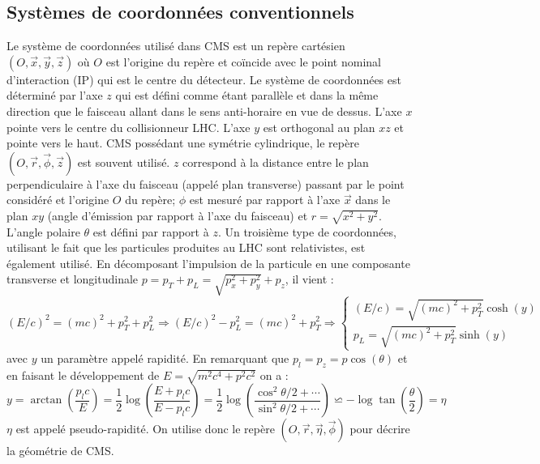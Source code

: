 \subsection{Systèmes de coordonnées conventionnels}
Le système de coordonnées utilisé dans CMS est un repère cartésien $\left(O,\vec{x},\vec{y},\vec{z}\right)$ où $O$ est l'origine du repère et coïncide avec le point nominal d'interaction (IP) qui est le centre du détecteur. Le système de coordonnées est déterminé par l'axe $z$ qui est défini comme étant parallèle et dans la même direction que le faisceau allant dans le sens anti-horaire en vue de dessus. L'axe $x$ pointe vers le centre du collisionneur LHC. L'axe $y$ est orthogonal au plan $xz$ et pointe vers le haut. CMS possédant une symétrie cylindrique, le repère $\left(O,\vec{r},\vec{\phi},\vec{z}\right)$ est souvent utilisé. $z$ correspond à la distance entre le plan perpendiculaire à l'axe du faisceau (appelé plan transverse) passant par le point considéré et l'origine $O$ du repère; $\phi$ est mesuré par rapport à l'axe $\vec{x}$ dans le plan $xy$ (angle d'émission par rapport à l'axe du faisceau) et $r=\sqrt{x^2+y^2}$. L'angle polaire $\theta$ est défini par rapport à $z$. Un troisième type de coordonnées, utilisant le fait que les particules produites au LHC sont relativistes, est également utilisé. En décomposant l'impulsion de la particule en une composante transverse et longitudinale $p=p_{T}+p_{L}=\sqrt{p_{x}^{2}+p_{y}^{2}}+p_{z}$, il vient :
\begin{equation}
(E/c)^{2}=(mc)^{2}+p_{T}^{2}+p_{L}^{2}\Longrightarrow (E/c)^{2}-p_{L}^{2}=(mc)^{2}+p_{T}^{2}\Longrightarrow  \begin{cases}
\left(E/c \right)=\sqrt{\left(mc \right)^{2}+p_{T}^{2}}\cosh(y) \\
p_{L}=\sqrt{\left(mc \right)^{2}+p_{T}^{2}}\sinh(y)
\end{cases}
\end{equation}
avec $y$ un paramètre appelé rapidité. En remarquant que $p_{l}=p_{z}=p\cos(\theta)$ et en faisant le développement de $E=\sqrt{m^{2}c^{4}+p^{2}c^{2}}$ on a :
\begin{equation}
y=\arctan\left(\frac{p_{l}c}{E}\right)=\frac{1}{2}\log\left(\frac{E+p_{l}c}{E-p_{l}c}\right)=\frac{1}{2}\log\left(\frac{\cos^2 \theta/2+\cdots}{\sin^2 \theta/2+\cdots}\right)\backsimeq-\log\tan\left(\frac{\theta}{2}\right)=\eta \label{eta}
\end{equation}
$\eta$ est appelé pseudo-rapidité. On utilise donc le repère $\left(O,\vec{r},\vec{\eta},\vec{\phi}\right)$ pour décrire la géométrie de CMS.

